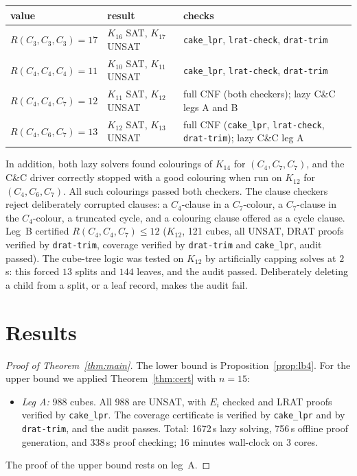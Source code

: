 \documentclass[11pt]{amsart}
\theoremstyle{definition}
\theoremstyle{remark}
\begin{document}
\begin{center}
\begin{tabular}{ll>{\raggedright\arraybackslash}p{6.2cm}}
\toprule
value & result & checks \\
\midrule
$R(C_3,C_3,C_3)=17$ \cite{Rad} & $K_{16}$ SAT, $K_{17}$ UNSAT & \texttt{cake\_lpr}, \texttt{lrat-check}, \texttt{drat-trim} \\
$R(C_4,C_4,C_4)=11$ \cite{Rad} & $K_{10}$ SAT, $K_{11}$ UNSAT & \texttt{cake\_lpr}, \texttt{lrat-check}, \texttt{drat-trim} \\
$R(C_4,C_4,C_7)=12$ \cite{SunYLZ2,Tse3} & $K_{11}$ SAT, $K_{12}$ UNSAT & full CNF (both checkers); lazy C\&C legs A and B \\
$R(C_4,C_6,C_7)=13$ \cite{SunYWLX,Tse3} & $K_{12}$ SAT, $K_{13}$ UNSAT & full CNF (\texttt{cake\_lpr}, \texttt{lrat-check}, \texttt{drat-trim}); lazy C\&C leg A \\
\bottomrule
\end{tabular}
\end{center}
\noindent In addition, both lazy solvers found colourings of $K_{14}$ for $(C_4,C_7,C_7)$, and the C\&C driver correctly stopped
with a good colouring when run on $K_{12}$ for $(C_4,C_6,C_7)$. All such colourings passed both checkers. The clause checkers reject
deliberately corrupted clauses: a $C_4$-clause in a $C_7$-colour, a $C_7$-clause in the $C_4$-colour, a truncated cycle, and a
colouring clause offered as a cycle clause. Leg~B certified $R(C_4,C_4,C_7)\le 12$ ($K_{12}$, 121 cubes, all UNSAT, DRAT proofs verified by
\texttt{drat-trim}, coverage verified by \texttt{drat-trim} and \texttt{cake\_lpr}, audit passed). The cube-tree logic was tested on
$K_{12}$ by artificially capping solves at $2$\,s: this forced $13$ splits and $144$ leaves, and the audit passed. Deliberately deleting a
child from a split, or a leaf record, makes the audit fail.

\section{Results}\label{sec:results}

\begin{proof}[Proof of Theorem~\ref{thm:main}]
The lower bound is Proposition~\ref{prop:lb4}. For the upper bound we applied Theorem~\ref{thm:cert} with $n=15$:
\begin{itemize}
\item \emph{Leg A:} 988 cubes. All 988 are UNSAT, with $E_i$ checked and LRAT proofs verified by \texttt{cake\_lpr}. The coverage
certificate is verified by \texttt{cake\_lpr} and by \texttt{drat-trim}, and the audit passes. Total: 1672\,s lazy solving, 756\,s
offline proof generation, and 338\,s proof checking; 16 minutes wall-clock on 3 cores.
\end{itemize}
The proof of the upper bound rests on leg~A.
\end{proof}
\end{document}
